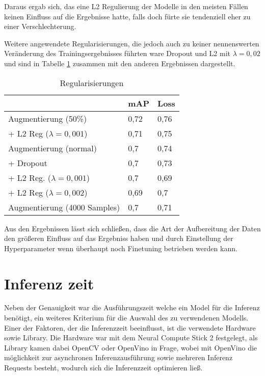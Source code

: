Daraus ergab sich, das eine L2 Regulierung der Modelle 
in den meisten Fällen keinen Einfluss auf die Ergebnisse hatte,
falls doch fürte sie tendenziell eher zu einer Verschlechterung.


Weitere angewendete Regularisierungen, die jedoch 
auch zu keiner nennenswerten Veränderung des Trainingsergebnisses 
führten ware Dropout und L2 mit $\lambda = 0,02$ und sind in 
Tabelle \ref{table:reg} zusammen mit den anderen Ergebnissen dargestellt.

\vspace{1cm}
\begin{table}[htb]
  \centering
  \begin{tabular}{m{}|m{}<{\centering}m{}<{\centering}}
  \hline
                    & mAP  & Loss  \\ \hline\hline
  Augmentierung (50\%) &  0,72    &    0,76   \\
   + L2 Reg ($\lambda = 0,001$)            &   0,71     & 0,75       \\\hline
  Augmentierung (normal)     & 0,7  & 0,74            \\
  + Dropout          & 0,7  & 0,73            \\
  + L2 Reg. ($\lambda = 0,001$)    & 0,7  & 0,69            \\
  + L2 Reg ($\lambda = 0,002$)    & 0,69 & 0,7             \\ \hline
  Augmentierung (4000 Samples) &0,7&0,71\\\hline
  \end{tabular}
  \caption{Regularisierungen}
  \label{table:reg}
\end{table}
\vspace{1cm}


Aus den Ergebnissen lässt sich schließen, dass die Art
der Aufbereitung der Daten den größeren Einfluss auf das Ergebniss haben
und durch Einstellung der Hyperparameter wenn überhaupt 
noch Finetuning betrieben werden kann.



\section{Inferenz zeit}\label{sec:infertime}

Neben der Genauigkeit war die Ausführungszeit welche ein Model für die 
Inferenz benötigt, ein weiteres Kriterium für die Auswahl des zu 
verwendenen Modells.
Einer der Faktoren, der die Inferenzzeit beeinflusst, ist die 
verwendete Hardware sowie Library.
Die Hardware war mit dem Neural Compute Stick 2 festgelegt, als 
Library kamen dabei OpenCV oder OpenVino in Frage, wobei
mit OpenVino die möglichkeit 
zur asynchronen Inferenzausführung sowie mehreren Inferenz Requests besteht,
wodurch sich die Inferenzzeit optimieren ließ.

